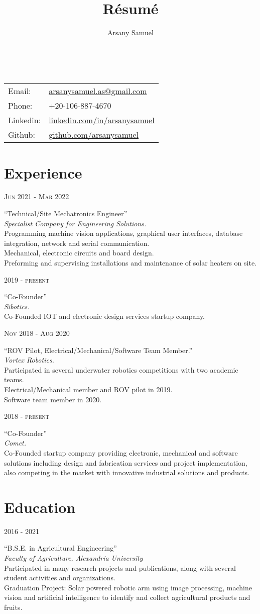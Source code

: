 \documentclass[a4paper]{article}
\title{R\'esum\'e}
\author{Arsany Samuel}
\makeatletter
\renewcommand{\maketitle}{
	\begin{center}
		{\Huge\bfseries{\theauthor}}\\
			\vspace{0.5em}
		{
			\begin{center}
				\large\begin{tabular}{l  l}
					Email: & \href{mailto:arsanysamuel.as@gmail.com}{arsanysamuel.as@gmail.com}  \\ 
					Phone: & +20-106-887-4670  \\
					Linkedin: & \href{https://linkedin.com/in/arsanysamuel}{linkedin.com/in/arsanysamuel}  \\
					Github: & \href{https://github.com/arsanysamuel}{github.com/arsanysamuel}
				\end{tabular}
			\end{center}
		}
	\end{center}
}
\newcommand{\ag}{Agricultural Engineering}
\newcommand{\foa}{Faculty of Agriculture}
\newcommand{\au}{Alexandria University}
\newcommand{\entry}[4]{   %
	\begin{center}
		\begin{minipage}[c]{0.25\linewidth}  %
			\vfill
			\hfill  %
			\textsc{#1}  %
			\vfill
		\end{minipage}
		\hfill\vline\hfill  %
		\begin{minipage}[c]{0.7\linewidth}
			\textrm{``#2''} \\
			\textit{#3} \\
			\footnotesize{#4}
		\end{minipage}
	\end{center}
}
\makeatother
\begin{document}
	\maketitle
	


	\section{Experience}
		\entry{Jun 2021 - Mar 2022}
			{Technical/Site Mechatronics Engineer}
			{Specialist Company for Engineering Solutions.}
			{Programming machine vision applications, graphical user interfaces, database integration, network and serial communication.\\Mechanical, electronic circuits and board design.\\Preforming and supervising installations and maintenance of solar heaters on site.}
		\entry{2019 - present}
			{Co-Founder}
			{Sibotics.}
			{Co-Founded IOT and electronic design services startup company.}
		\entry{Nov 2018 - Aug 2020}
			{ROV Pilot, Electrical/Mechanical/Software Team Member.}
			{Vortex Robotics.}
			{Participated in several underwater robotics competitions with two academic teams.\\Electrical/Mechanical member and ROV pilot in 2019.\\Software team member in 2020.}
		\entry{2018 - present}  %
			{Co-Founder}
			{Comet.}
			{Co-Founded startup company providing electronic, mechanical and software solutions including design and fabrication services and project implementation, also competing in the market with innovative industrial solutions and products.}

	\section{Education}
		\entry{2016 - 2021}
			{B.S.E. in \ag}
			{\foa, \au }
			{
				Participated in many research projects and publications, along with several student activities and organizations.\\
				Graduation Project: Solar powered robotic arm using image processing, machine vision and artificial intelligence to identify and collect agricultural products and fruits.
			}
\end{document}
